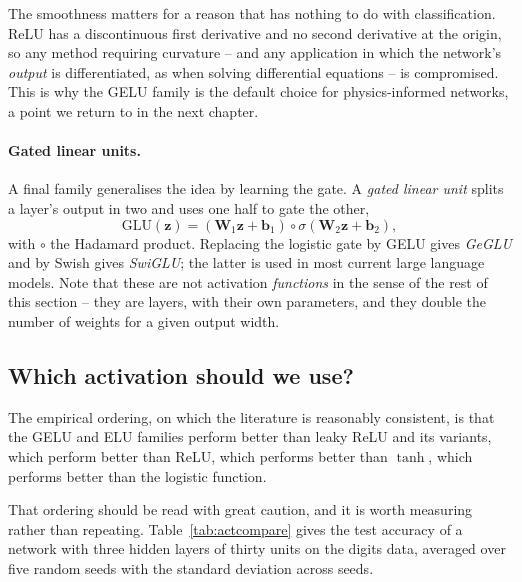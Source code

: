 The smoothness matters for a reason that has nothing to do with
classification.  ReLU has a discontinuous first derivative and no second
derivative at the origin, so any method requiring curvature -- and any
application in which the network's \emph{output} is differentiated, as when
solving differential equations -- is compromised.  This is why the GELU family
is the default choice for physics-informed networks, a point we return to in
the next chapter.

\paragraph{Gated linear units.}
A final family generalises the idea by learning the gate.  A \emph{gated linear
unit} splits a layer's output in two and uses one half to gate the other,
\begin{equation}
  \mathrm{GLU}(\bm{z}) = \left(\bm{W}_1\bm{z}+\bm{b}_1\right)
    \circ \sigma\!\left(\bm{W}_2\bm{z}+\bm{b}_2\right),
  \label{eq:8-glu}
\end{equation}
with $\circ$ the Hadamard product.  Replacing the logistic gate by GELU gives
\emph{GeGLU} and by Swish gives \emph{SwiGLU}; the latter is used in most
current large language models.  Note that these are not activation
\emph{functions} in the sense of the rest of this section -- they are layers,
with their own parameters, and they double the number of weights for a given
output width.

\subsection{Which activation should we use?}
\label{sec:whichact}

The empirical ordering, on which the literature is reasonably consistent, is
that the GELU and ELU families perform better than leaky ReLU and its variants,
which perform better than ReLU, which performs better than $\tanh$, which
performs better than the logistic function.

That ordering should be read with great caution, and it is worth measuring
rather than repeating.  Table~\ref{tab:actcompare} gives the test accuracy of a
network with three hidden layers of thirty units on the digits data, averaged
over five random seeds with the standard deviation across seeds.

